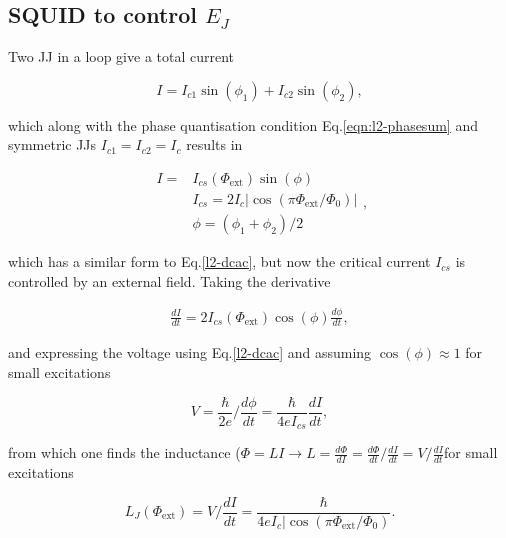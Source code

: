    
   \subsection{SQUID to control $ E_J $\cite{zhu2010}}
   Two JJ in a loop give a total current
    
    \begin{equation}
      I = I_{c1}\sin(\phi_1)+I_{c2}\sin(\phi_2),
    \end{equation}
   
    \noindent which along with the phase quantisation condition Eq.\eqref{eqn:l2-phasesum} and
    symmetric JJs $I_{c1}=I_{c2}=I_c$ results in
    
    \begin{equation}
      \begin{aligned}
        I = & I_{cs}(\Phi_\text{ext})\sin(\phi)\\
        & I_{cs} = 2I_c|\cos(\pi\Phi_\text{ext}/\Phi_0)|\\
        & \phi = (\phi_1+\phi_2)/2
      \end{aligned},
    \end{equation}
    
    \noindent which  has a similar  form to Eq.\eqref{l2-dcac},  but now the  critical current
    $I_{cs}$ is controlled by an external field. Taking the derivative
     
    \begin{equation}
      \begin{aligned}
    	\frac{dI}{dt}=2I_{cs}(\Phi_\text{ext})\cos(\phi)\frac{d\phi}{dt},
      \end{aligned}
    \end{equation}
    
    \noindent   and   expressing   the   voltage   using   Eq.\eqref{l2-dcac}   and   assuming
    $\cos(\phi)\approx1$ for small excitations

    \begin{equation}
      V = \frac{\hbar}{2e}/\frac{d\phi}{dt} = \frac{\hbar}{4eI_{cs}}\frac{dI}{dt},
    \end{equation}
    
    \noindent         from        which         one        finds         the        inductance
    ($\Phi  =  LI   \rightarrow  L  =  \frac{d\Phi}{dI}   =  \frac{d\Phi}{dt}/\frac{dI}{dt}  =
    V/\frac{dI}{dt}$for small excitations
    
    \begin{equation}
      L_J(\Phi_\text{ext}) = V/\frac{dI}{dt} = \frac{\hbar}{4eI_c|\cos(\pi\Phi_\text{ext}/\Phi_0)}.
      \label{l2:squid:inductance}
    \end{equation}
    \vspace{6ex}
   
